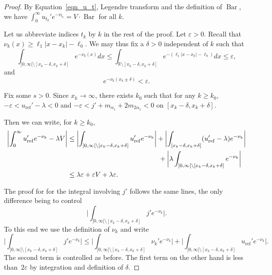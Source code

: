 \documentclass[JEP,XML,SOM,Unicode, NoEqCountersInSection, NoFloatCountersInSection]{cedram}
\let\epsilon\varepsilon
\theoremstyle{plain}
\theoremstyle{definition}
\DeclareMathOperator{\barDH}{Bar}
\begin{document}
\begin{proof}
By Equation~\eqref{eqn_u_t}, Legendre transform
and the definition of $\barDH$, we have
$\int_0^{\infty}u_{t_k}'e^{-\nu_{t_k}}= V\cdot \barDH$ for all $k$.

Let us abbreviate indices $t_k$ by $k$ in the rest of the proof.
Let $\epsilon>0$.
Recall that $\nu_k(x)\geq \ell_1|x-x_k|-\ell_0$.
We may thus fix a $\delta>0$ independent of $k$ such that
\begin{equation*}
\int_{]0,\infty[\setminus [x_k-\delta,x_k+\delta]}e^{-\nu_k(x)}dx
\leq \int_{\mathbb{R}\setminus [x_k-\delta,x_k+\delta]}e^{-( \ell_1|x-x_k|-\ell_0)}dx
\leq \epsilon,
\end{equation*}
and
\begin{equation*}
e^{-\nu_k(x_k\pm\delta)}<\epsilon.
\end{equation*}

Fix some $s>0$. Since $x_k\to \infty$, there exists $k_0$
such that for any $k\geq k_0$,
$-\epsilon<u_{\mathrm{ref}}'-\lambda<0$ and
$-\epsilon<j'+m_{\alpha_1}+2m_{2\alpha_1}<0$ on $[x_k-\delta,x_k+\delta]$.

Then we can write, for $k\geq k_0$,
\begin{align*}
\biggl|\int_0^{\infty}u_{\mathrm{ref}}'e^{-\nu_k} -\lambda V \biggr|
& \leq \biggl|\int_{]0,\infty[\setminus [x_k-\delta,x_k+\delta]}u_{\mathrm{ref}}'e^{-\nu_k} \biggr|+
\biggl|\int_{[x_k-\delta,x_k+\delta]}(u_{\mathrm{ref}}'-\lambda)e^{-\nu_k} \biggr| \\
& \hspace*{4.7cm} + \biggl |\lambda\int_{]0,\infty[\setminus [x_k-\delta,x_k+\delta]}e^{-\nu_k} \biggr| \\
& \leq \lambda\epsilon+\epsilon V+\lambda\epsilon.
\end{align*}

The proof for for the integral involving $j'$ follows the same lines, the only
difference being to control
\begin{equation*}
\biggl |\int_{]0,\infty[\setminus [x_k-\delta,x_k+\delta]}j'e^{-\nu_k} \biggr|.
\end{equation*}
To this end we use the definition of $\nu_k$ and write
\begin{equation*}
\biggl |\int_{]0,\infty[\setminus [x_k-\delta,x_k+\delta]}j'e^{-\nu_k} \biggr|
\leq \biggl |\int_{]0,\infty[\setminus [x_k-\delta,x_k+\delta]}\nu_{k}'e^{-\nu_k} \biggr|
+ \biggl |\int_{]0,\infty[\setminus [x_k-\delta,x_k+\delta]}u_{\mathrm{ref}}'e^{-\nu_k} \biggr|.
\end{equation*}
The second term is controlled as before.
The first term on the other hand is less than~$2\epsilon$ by
integration and definition of $\delta$.
\end{proof}
\end{document}
